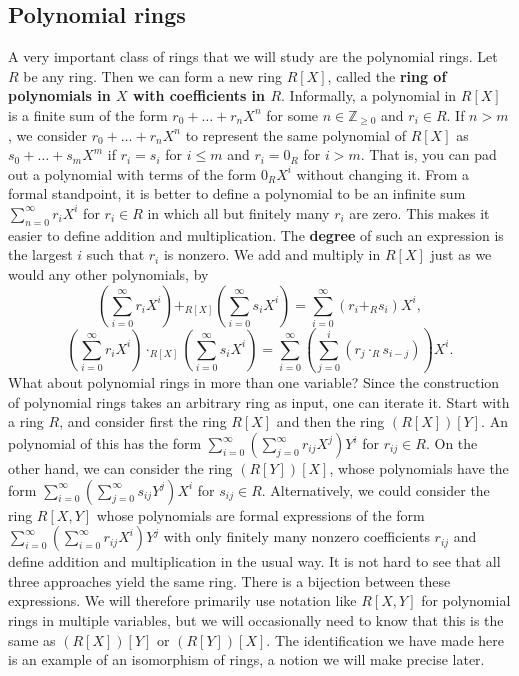 \documentclass{article}
\newcommand{\Z}{\mathbb{Z}}
\newcommand{\rb}[1]{\left( #1 \right)}
\renewcommand{\sb}[1]{\left[ #1 \right]}
\theoremstyle{definition}\newtheorem{definition}{Definition}[subsection]
\theoremstyle{definition}\newtheorem{remark}[definition]{Remark}
\theoremstyle{definition}\newtheorem*{example}{Example}
\theoremstyle{definition}\newtheorem*{note}{Note}
\begin{document}

\subsection{Polynomial rings}

A very important class of rings that we will study are the polynomial rings. Let $ R $ be any ring. Then we can form a new ring $ R\sb{X} $, called the \textbf{ring of polynomials in $ X $ with coefficients in $ R $}. Informally, a polynomial in $ R\sb{X} $ is a finite sum of the form $ r_0 + \dots + r_nX^n $ for some $ n \in \Z_{\ge 0} $ and $ r_i \in R $. If $ n > m $, we consider $ r_0 + \dots + r_nX^n $ to represent the same polynomial of $ R\sb{X} $ as $ s_0 + \dots + s_mX^m $ if $ r_i = s_i $ for $ i \le m $ and $ r_i = 0_R $ for $ i > m $. That is, you can pad out a polynomial with terms of the form $ 0_RX^i $ without changing it. From a formal standpoint, it is better to define a polynomial to be an infinite sum $ \sum_{n = 0}^\infty r_iX^i $ for $ r_i \in R $ in which all but finitely many $ r_i $ are zero. This makes it easier to define addition and multiplication. The \textbf{degree} of such an expression is the largest $ i $ such that $ r_i $ is nonzero. We add and multiply in $ R\sb{X} $ just as we would any other polynomials, by
$$ \rb{\sum_{i = 0}^\infty r_iX^i} +_{R\sb{X}} \rb{\sum_{i = 0}^\infty s_iX^i} = \sum_{i = 0}^\infty \rb{r_i +_R s_i} X^i, $$
$$ \rb{\sum_{i = 0}^\infty r_iX^i} \cdot_{R\sb{X}} \rb{\sum_{i = 0}^\infty s_iX^i} = \sum_{i = 0}^\infty \rb{\sum_{j = 0}^i \rb{r_j \cdot_R s_{i - j}}} X^i. $$
What about polynomial rings in more than one variable? Since the construction of polynomial rings takes an arbitrary ring as input, one can iterate it. Start with a ring $ R $, and consider first the ring $ R\sb{X} $ and then the ring $ \rb{R\sb{X}}\sb{Y} $. An polynomial of this has the form $ \sum_{i = 0}^\infty \rb{\sum_{j = 0}^\infty r_{ij}X^j}Y^i $ for $ r_{ij} \in R $. On the other hand, we can consider the ring $ \rb{R\sb{Y}}\sb{X} $, whose polynomials have the form $ \sum_{i = 0}^\infty \rb{\sum_{j = 0}^\infty s_{ij}Y^j}X^i $ for $ s_{ij} \in R $. Alternatively, we could consider the ring $ R\sb{X, Y} $ whose polynomials are formal expressions of the form $ \sum_{i = 0}^\infty \rb{\sum_{i = 0}^\infty r_{ij}X^i}Y^j $ with only finitely many nonzero coefficients $ r_{ij} $ and define addition and multiplication in the usual way. It is not hard to see that all three approaches yield the same ring. There is a bijection between these expressions. We will therefore primarily use notation like $ R\sb{X, Y} $ for polynomial rings in multiple variables, but we will occasionally need to know that this is the same as $ \rb{R\sb{X}}\sb{Y} $ or $ \rb{R\sb{Y}}\sb{X} $. The identification we have made here is an example of an isomorphism of rings, a notion we will make precise later.
\end{document}
